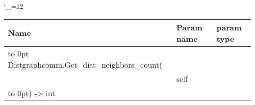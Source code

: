\begingroup \catcode`\_=12 \tt
\begin{tabular}{lll}
\toprule
\textrm{Name}&\textrm{Param name}&\textrm{param type}\\
\midrule
\hbox to 0pt {Distgraphcomm.Get_dist_neighbors_count(\hss}\\
& self\\
\hbox to 0pt{) -> int\hss}\\
\bottomrule
\end{tabular}
\endgroup
